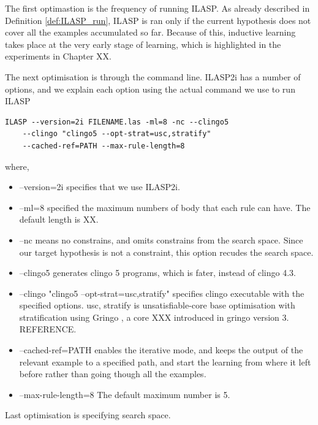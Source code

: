 The first optimastion is the frequency of running ILASP. 
As already described in Definition \ref{def:ILASP_run}, ILASP is ran only if the current hypothesis does not cover all the examples accumulated so far.
Because of this, inductive learning takes place at the very early stage of learning, which is highlighted in the experiments in Chapter XX. 

The next optimisation is through the command line. 
ILASP2i has a number of options, and we explain each option using the actual command we use to run ILASP


\begin{lstlisting}[]
    ILASP --version=2i FILENAME.las -ml=8 -nc --clingo5 
    --clingo "clingo5 --opt-strat=usc,stratify" 
    --cached-ref=PATH --max-rule-length=8
\end{lstlisting}

where,
\begin{itemize}
\item \textsf{--version=2i} specifies that we use ILASP2i.
\item \textsf{--ml=8} specified the maximum numbers of body that each rule can have. The default length is XX.
\item \textsf{--nc} means no constrains, and omits constrains from the search space. Since our target hypothesis is not a constraint, this option recudes the search space.
\item \textsf{--clingo5} generates clingo 5 programs, which is fater, instead of clingo 4.3.
\item \textsf{--clingo "clingo5 --opt-strat=usc,stratify"} specifies clingo executable with the specified options. 
\textsf{usc, stratify} is unsatisfiable-core base optimisation with stratification using Gringo \cite{gringo}, a core XXX introduced in gringo version 3. REFERENCE.
\item \textsf{--cached-ref=PATH} enables the iterative mode, and keeps the output of the relevant example to a specified path, and start the learning from where it left before rather than going though all the examples.
\item \textsf{--max-rule-length=8} The default maximum number is 5.
\end{itemize}

Last optimisation is specifying search space.

